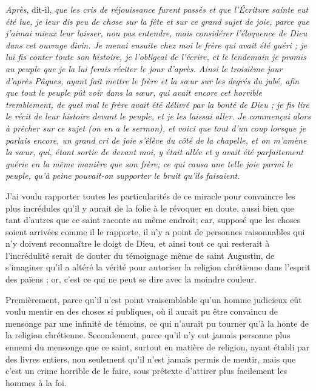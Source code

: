 \emph{Après}, dit-il, \emph{que les cris de réjouissance furent passés et que l'Écriture sainte eut été lue, je leur dis peu de chose sur la fête et sur ce grand sujet de joie, parce que j'aimai mieux leur laisser, non pas entendre, mais considérer l'éloquence de Dieu dans cet ouvrage divin. Je menai ensuite chez moi le frère qui avait été guéri ; je lui fis conter toute son histoire, je l'obligeai de l'écrire, et le lendemain je promis au peuple que je la lui ferais réciter le jour d'après. Ainsi le troisième jour d'après Pâques, ayant fait mettre le frère et la sœur sur les degrés du jubé, afin que tout le peuple pût voir dans la sœur, qui avait encore cet horrible tremblement, de quel mal le frère avait été délivré par la bonté de Dieu ; je fis lire le récit de leur histoire devant le peuple, et je les laissai aller. Je commençai alors à prêcher sur ce sujet (on en a le sermon), et voici que tout d'un coup lorsque je parlais encore, un grand cri de joie s'élève du côté de la chapelle, et on m'amène la sœur, qui, étant sortie de devant moi, y était allée et y avait été parfaitement guérie en la même manière que son frère; ce qui causa une telle joie parmi le peuple, qu'à peine pouvait-on supporter le bruit qu'ils faisaient}.

J'ai voulu rapporter toutes les particularités de ce miracle pour convaincre les plus incrédules qu'il y aurait de la folie à le révoquer en doute, aussi bien que tant d'autres que ce saint raconte au même endroit; car, supposé que les choses soient arrivées comme il le rapporte, il n'y a point de personnes raisonnables qui n'y doivent reconnaître le doigt de Dieu, et ainsi tout ce qui resterait à l'incrédulité serait de douter du témoignage même de saint Augustin, de s'imaginer qu'il a altéré la vérité pour autoriser la religion chrétienne dans l'esprit des païens ; or, c'est ce qui ne peut se dire avec la moindre couleur.

Premièrement, parce qu'il n'est point vraisemblable qu'un homme judicieux eût voulu mentir en des choses si publiques, où il aurait pu être convaincu de mensonge par une infinité de témoins, ce qui n'aurait pu tourner qu'à la honte de la religion chrétienne. Secondement, parce qu'il n'y eut jamais personne plus ennemi du mensonge que ce saint, surtout en matière de religion, ayant établi par des livres entiers, non seulement qu'il n'est jamais permis de mentir, mais que c'est un crime horrible de le faire, sous prétexte d'attirer plus facilement les hommes à la foi.

